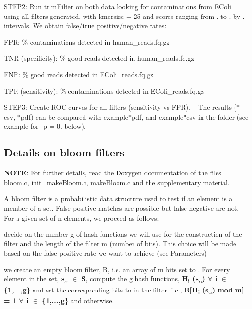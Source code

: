 \begin{DoxyItemize}
\item S\+T\+E\+P2\+: Run trim\+Filter on both data looking for contaminations from E\+Coli using all filters generated, with {\ttfamily kmersize = 25} and scores ranging from {.} to {.} by {.} intervals. We obtain false/true positive/negative rates\+:
\begin{DoxyItemize}
\item F\+PR\+: \% contaminations detected in human\+\_\+reads.\+fq.\+gz
\item T\+NR (specificity)\+: \% good reads detected in {\ttfamily human\+\_\+reads.\+fq.\+gz}
\item F\+NR\+: \% good reads detected in {\ttfamily E\+Coli\+\_\+reads.\+fq.\+gz}
\item T\+PR (sensitivity)\+: \% contaminations detected in {\ttfamily E\+Coli\+\_\+reads.\+fq.\+gz}
\end{DoxyItemize}
\item S\+T\+E\+P3\+: Create R\+OC curves for all filters (sensitivity vs F\+PR). ~\newline
 The results ({\ttfamily $\ast$csv}, {\ttfamily $\ast$pdf}) can be compared with {\ttfamily example$\ast$pdf}, and {\ttfamily example$\ast$csv} in the folder (see example for {\ttfamily -\/p = 0.} below).
\end{DoxyItemize}

 

\subsection*{Details on bloom filters}

{\bfseries N\+O\+TE}\+: For further details, read the {\ttfamily Doxygen} documentation of the files {\ttfamily bloom.\+c}, {\ttfamily init\+\_\+make\+Bloom.\+c}, {\ttfamily make\+Bloom.\+c} and the supplementary material.

A bloom filter is a probabilistic data structure used to test if an element is a member of a set. False positive matches are possible but false negative are not. For a given set of {\ttfamily n} elements, we proceed as follows\+:


\begin{DoxyItemize}
\item decide on the number {\ttfamily g} of hash functions we will use for the construction of the filter and the length of the filter {\ttfamily m} (number of bits). This choice will be made based on the false positive rate we want to achieve (see Parameters)
\item we create an empty bloom filter, {\ttfamily B}, i.\+e. an array of {\ttfamily m} bits set to {}. For every element in the set, {\bfseries s\textsubscript{{$\alpha$}} {$\in$} S}, compute the {\ttfamily g} hash functions, {\bfseries H\textsubscript{i} (s\textsubscript{{$\alpha$}}) {$\forall$} i {$\in$} \{1,...,g\}} and set the corresponding bits to {} in the filter, i.\+e., {\bfseries B\mbox{[}H\textsubscript{i} (s\textsubscript{{$\alpha$}}) mod m\mbox{]} = 1 {$\forall$} i {$\in$} \{1,...,g\}} and {} otherwise.
\end{DoxyItemize}


